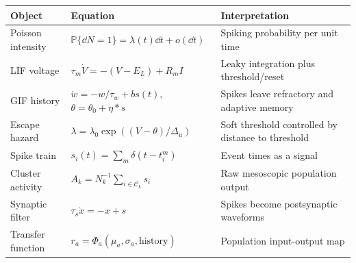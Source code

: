 \begin{chaptersummary}

\begin{center}
\renewcommand{\arraystretch}{1.55}
\begin{tabularx}{\textwidth}{@{}l X X@{}}
  \toprule
  \textbf{Object} & \textbf{Equation} & \textbf{Interpretation} \\
  \midrule
  Poisson intensity &
  $\mathbb{P}\{\dd N=1\}=\lambda(t)\dd t+o(\dd t)$ &
  Spiking probability per unit time \\
  LIF voltage &
  $\tau_m\dot V=-(V-E_L)+R_m I$ &
  Leaky integration plus threshold/reset \\
  GIF history &
  $\dot w=-w/\tau_w+bs(t)$, $\theta=\theta_0+\eta*s$ &
  Spikes leave refractory and adaptive memory \\
  Escape hazard &
  $\lambda=\lambda_0\exp((V-\theta)/\Delta_u)$ &
  Soft threshold controlled by distance to threshold \\
  Spike train &
  $s_i(t)=\sum_m\delta(t-t_i^m)$ &
  Event times as a signal \\
  Cluster activity &
  $A_k=N_k^{-1}\sum_{i\in\mathcal{C}_k}s_i$ &
  Raw mesoscopic population output \\
  Synaptic filter &
  $\tau_s\dot x=-x+s$ &
  Spikes become postsynaptic waveforms \\
  Transfer function &
  $r_a=\Phi_a(\mu_a,\sigma_a,\text{history})$ &
  Population input-output map \\
  \bottomrule
\end{tabularx}
\end{center}

\end{chaptersummary}


